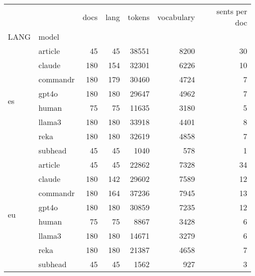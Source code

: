 \begin{tabular}{llrrrrr}
\toprule
 &  & docs & lang & tokens & vocabulary & sents per doc \\
LANG & model &  &  &  &  &  \\
\midrule
\multirow[t]{8}{*}{es} & article & 45 & 45 & 38551 & 8200 & 30 \\
 & claude & 180 & 154 & 32301 & 6226 & 10 \\
 & commandr & 180 & 179 & 30460 & 4724 & 7 \\
 & gpt4o & 180 & 180 & 29647 & 4962 & 7 \\
 & human & 75 & 75 & 11635 & 3180 & 5 \\
 & llama3 & 180 & 180 & 33918 & 4401 & 8 \\
 & reka & 180 & 180 & 32619 & 4858 & 7 \\
 & subhead & 45 & 45 & 1040 & 578 & 1 \\
\cline{1-7}
\multirow[t]{8}{*}{eu} & article & 45 & 45 & 22862 & 7328 & 34 \\
 & claude & 180 & 142 & 29602 & 7589 & 12 \\
 & commandr & 180 & 164 & 37236 & 7945 & 13 \\
 & gpt4o & 180 & 180 & 30859 & 7235 & 12 \\
 & human & 75 & 75 & 8867 & 3428 & 6 \\
 & llama3 & 180 & 180 & 14671 & 3279 & 6 \\
 & reka & 180 & 180 & 21387 & 4658 & 7 \\
 & subhead & 45 & 45 & 1562 & 927 & 3 \\
\cline{1-7}
\bottomrule
\end{tabular}
